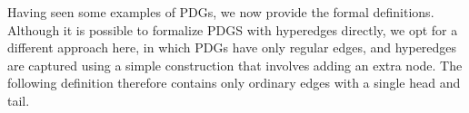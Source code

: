 \documentclass{article}
\theoremstyle{plain}
\theoremstyle{definition}
\theoremstyle{remark}
\newcommand{\MN}{PDG}
\newcommand{\MNs}{\MN s}
\numberwithin{equation}{section}
\begin{document}
	Having seen some examples of \MNs, we now provide the formal
        definitions.
	Although it is possible to formalize PDGS with hyperedges directly,
        we opt for a different approach here, in which PDGs 
		have only regular edges,
	 	and hyperedges are captured using a simple construction
        that involves adding an extra node.
        	The following definition therefore contains only ordinary
        edges with a single head and tail.%
\end{document}
